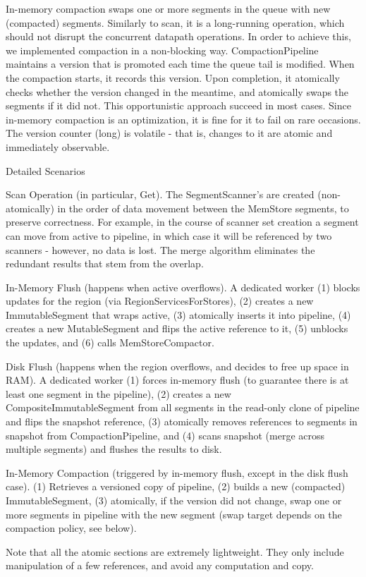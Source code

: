 In-memory compaction swaps one or more segments in the queue with new (compacted) segments. Similarly to scan, it is a long-running operation, which should not disrupt the concurrent datapath operations. In order to achieve this, we implemented compaction in a non-blocking way. CompactionPipeline maintains a version that is promoted each time the queue tail is modified. When the compaction starts, it records this version. Upon completion, it atomically checks whether the version changed in the meantime, and atomically swaps the segments if it did not. This opportunistic approach succeed in most cases. Since in-memory compaction is an optimization, it is fine for it to fail on rare occasions. The version counter (long) is volatile - that is, changes to it are atomic and immediately observable. 

Detailed Scenarios

Scan Operation (in particular, Get). The SegmentScanner’s are created (non-atomically) in the order of data movement between the MemStore segments, to preserve correctness. For example, in the course of scanner set creation a segment can move from active to pipeline, in which case it will be referenced by two scanners - however, no data is lost. The merge algorithm eliminates the redundant results that stem from the overlap.

In-Memory Flush (happens when active overflows). A dedicated worker (1) blocks updates for the region (via RegionServicesForStores), (2) creates a new ImmutableSegment that wraps active, (3) atomically inserts it into pipeline, (4) creates a new MutableSegment and flips the active reference to it, (5) unblocks the updates, and (6) calls MemStoreCompactor. 

Disk Flush (happens when the region overflows, and decides to free up space in RAM). A dedicated worker (1) forces in-memory flush (to guarantee there is at least one segment in the pipeline), (2) creates a new CompositeImmutableSegment from all segments in the read-only clone of pipeline and flips the snapshot reference, (3) atomically removes references to segments in snapshot from CompactionPipeline, and (4) scans snapshot (merge across multiple segments) and flushes the results to disk. 

In-Memory Compaction (triggered by in-memory flush, except in the disk flush case). (1) Retrieves a versioned copy of pipeline, (2) builds a new (compacted) ImmutableSegment, (3) atomically, if the version did not change, swap one or more segments in pipeline with the new segment (swap target depends on the compaction policy, see below). 

Note that all the atomic sections are extremely lightweight. They only include manipulation of a few references, and avoid any computation and copy. 
